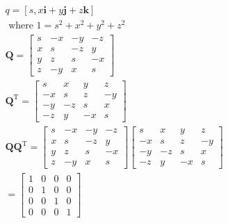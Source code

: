 $$
    \begin{aligned}
         & q=[s, x \mathbf{i}+y \mathbf{j}+z \mathbf{k}]                                                                     \\
         & \text { where } 1=s^{2}+x^{2}+y^{2}+z^{2}                                                                         \\
         & \mathbf{Q}=\left[\begin{array}{rrrr}
                s & -x & -y & -z \\
                x & s  & -z & y  \\
                y & z  & s  & -x \\
                z & -y & x  & s
            \end{array}\right]                                                                \\
         & \mathbf{Q}^{\mathrm{T}}=\left[\begin{array}{rrrr}
                s  & x  & y  & z  \\
                -x & s  & z  & -y \\
                -y & -z & s  & x  \\
                -z & y  & -x & s
            \end{array}\right]                                                   \\
         & \mathbf{Q} \mathbf{Q}^{\mathrm{T}}=\left[\begin{array}{rrrr}
                s & -x & -y & -z \\
                x & s  & -z & y  \\
                y & z  & s  & -x \\
                z & -y & x  & s
            \end{array}\right]\left[\begin{array}{rrrr}
                s  & x  & y  & z  \\
                -x & s  & z  & -y \\
                -y & -z & s  & x  \\
                -z & y  & -x & s
            \end{array}\right] \\
         & =\left[\begin{array}{llll}
                1 & 0 & 0 & 0 \\
                0 & 1 & 0 & 0 \\
                0 & 0 & 1 & 0 \\
                0 & 0 & 0 & 1
            \end{array}\right]
    \end{aligned}
$$


